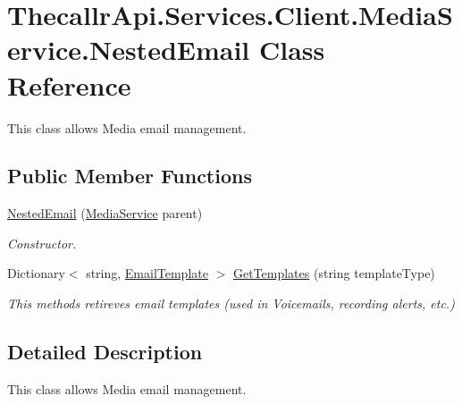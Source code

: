\hypertarget{class_thecallr_api_1_1_services_1_1_client_1_1_media_service_1_1_nested_email}{\section{Thecallr\+Api.\+Services.\+Client.\+Media\+Service.\+Nested\+Email Class Reference}
\label{class_thecallr_api_1_1_services_1_1_client_1_1_media_service_1_1_nested_email}
}


This class allows Media email management.  


\subsection*{Public Member Functions}
\begin{DoxyCompactItemize}
\item 
\hyperlink{class_thecallr_api_1_1_services_1_1_client_1_1_media_service_1_1_nested_email_ad2a6f74decf8c09ee38bf24c10891451}{Nested\+Email} (\hyperlink{class_thecallr_api_1_1_services_1_1_client_1_1_media_service}{Media\+Service} parent)
\begin{DoxyCompactList}\small\item\em Constructor. \end{DoxyCompactList}\item 
Dictionary$<$ string, \hyperlink{class_thecallr_api_1_1_objects_1_1_media_1_1_email_template}{Email\+Template} $>$ \hyperlink{class_thecallr_api_1_1_services_1_1_client_1_1_media_service_1_1_nested_email_a8fc8a8d8753629867492438b88faa127}{Get\+Templates} (string template\+Type)
\begin{DoxyCompactList}\small\item\em This methods retireves email templates (used in Voicemails, recording alerts, etc.) \end{DoxyCompactList}\end{DoxyCompactItemize}


\subsection{Detailed Description}
This class allows Media email management. 



